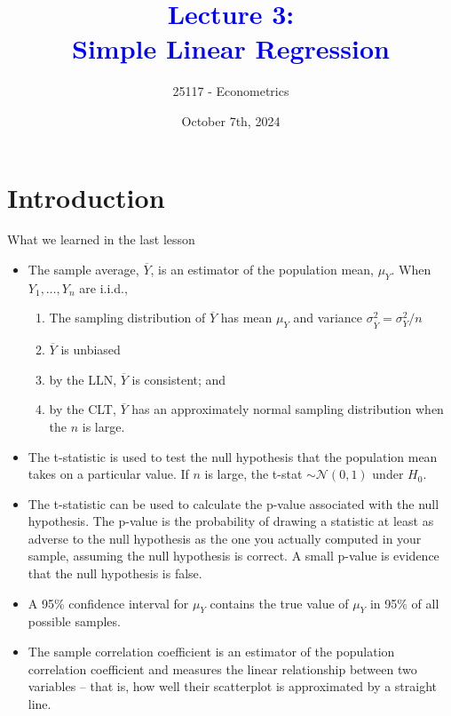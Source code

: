 \documentclass[notes,10pt, aspectratio=169]{beamer}
\title[]{\textcolor{blue}{Lecture 3:\\Simple Linear Regression}}
\author{25117 - Econometrics}
\institute[shortinst]{Universitat Pompeu Fabra}
\date{October 7th, 2024}
\begin{document}

\begin{frame}[plain]
\maketitle
\end{frame}

\section{Introduction}

\begin{frame}{What we learned in the last lesson}
\begin{itemize}
    \item The sample average, $\overline{Y}$, is an estimator of the population mean, $\mu_Y$. When $Y_1, \dots ,Y_n$ are i.i.d.,
    \begin{enumerate}
        \item  The sampling distribution of $\overline{Y}$ has mean $\mu_Y$ and variance $\sigma_{\overline{Y}}^2=\sigma_Y^2/n$
        \item $\overline{Y}$ is unbiased
        \item by the LLN, $\overline{Y}$ is consistent; and
        \item by the CLT, $\overline{Y}$ has an approximately normal sampling distribution when the $n$ is large.
    \end{enumerate}
    \item The t-statistic is used to test the null hypothesis that the population mean takes on a particular value. If $n$ is large, the t-stat $\sim \mathcal{N}(0,1)$ under $H_0$.
    \item The t-statistic can be used to calculate the p-value associated with the null hypothesis. The p-value is the probability of drawing a statistic at least as adverse to the null hypothesis as the one you actually computed in your sample, assuming the null hypothesis is correct. A small p-value is evidence that the null hypothesis is false.
    \item A 95\% confidence interval for $\mu_Y$ contains the true value of $\mu_Y$ in 95\% of all possible samples.
    \item The sample correlation coefficient is an estimator of the population correlation coefficient and measures the linear relationship between two variables -- that is, how well their scatterplot is approximated by a straight line.
\end{itemize}
\end{frame}
\end{document}

